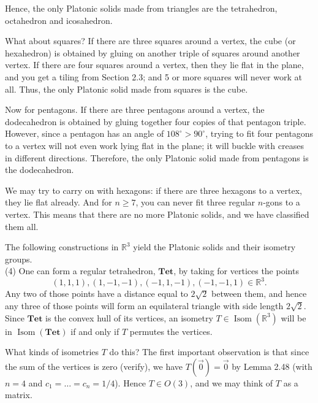 \documentclass[leqno]{book}
\begin{document}
Hence, the only Platonic solids made from triangles are the tetrahedron, octahedron and icosahedron.

What about squares?  If there are three squares around a vertex, the cube (or hexahedron) is obtained by gluing on another triple of squares around another vertex.  If there are four squares around a vertex, then they lie flat in the plane, and you get a tiling from Section 2.3; and 5 or more squares will never work at all.  Thus, the only Platonic solid made from squares is the cube.

Now for pentagons.  If there are three pentagons around a vertex, the dodecahedron is obtained by gluing together four copies of that pentagon triple.  However, since a pentagon has an angle of $108^\circ>90^\circ$, trying to fit four pentagons to a vertex will not even work lying flat in the plane; it will buckle with creases in different directions.  Therefore, the only Platonic solid made from pentagons is the dodecahedron.

We may try to carry on with hexagons: if there are three hexagons to a vertex, they lie flat already.  And for $n\geqslant 7$, you can never fit three regular $n$-gons to a vertex.  This means that there are no more Platonic solids, and we have classified them all.

The following constructions in $\mathbb R^3$ yield the Platonic solids and their isometry groups.\\

(4) One can form a regular tetrahedron, $\mathbf{Tet}$, by taking for vertices the points
$$(1,1,1),(1,-1,-1),(-1,1,-1),(-1,-1,1)\in\mathbb R^3.$$
Any two of those points have a distance equal to $2\sqrt 2$ between them, and hence any three of those points will form an equilateral triangle with side length $2\sqrt 2$.  Since $\mathbf{Tet}$ is the convex hull of its vertices, an isometry $T\in\operatorname{Isom}(\mathbb R^3)$ will be in $\operatorname{Isom}(\mathbf{Tet})$ if and only if $T$ permutes the vertices.

What kinds of isometries $T$ do this?  The first important observation is that since the sum of the vertices is zero (verify), we have $T(\vec 0)=\vec 0$ by Lemma 2.48 (with $n=4$ and $c_1=\dots=c_n=1/4$).  Hence $T\in O(3)$, and we may think of $T$ as a matrix.
\end{document}
